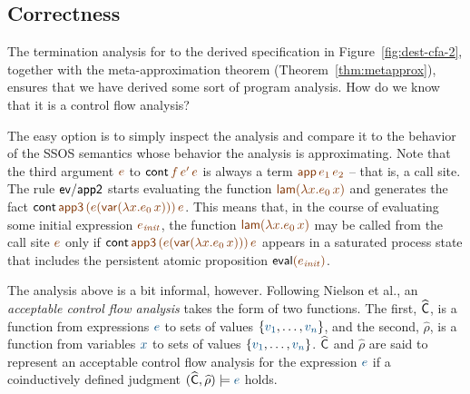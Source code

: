 \subsection{Correctness}

The termination analysis for to the derived specification in
Figure~\ref{fig:dest-cfa-2}, together with the meta-approximation
theorem (Theorem~\ref{thm:metapprox}), ensures that we have derived
some sort of program analysis. How do we know that it is a control 
flow analysis? 

The easy option is to simply inspect the analysis and compare it to
the behavior of the SSOS semantics whose behavior the analysis is
approximating.  Note that the third argument $\lf{e}$ to ${\sf
  cont}\,\lf{f}\,\lf{e'}\,\lf{e}$ is always a term $\lf{{\sf
    app}\,e_1\,e_2}$ -- that is, a call site. The rule ${\sf ev/app2}$
starts evaluating the function $\lf{{\sf lam}(\lambda x.e_0\,x)}$ and
generates the fact ${\sf cont}\,\lf{\sf app3}\,\lf{(e({\sf
    var}(\lambda x.e_0\,x)))}\,\lf{e}$. This means that, in the course
of evaluating some initial expression $\lf{e_{\it init}}$, the
function $\lf{{\sf lam}(\lambda x.e_0\,x)}$ may be called from the
call site $\lf{e}$ only if ${\sf cont}\,\lf{\sf app3}\,\lf{(e({\sf
    var}(\lambda x.e_0\,x)))}\,\lf{e}$ appears in a saturated process
state that includes the persistent atomic proposition ${\sf
  eval}\lf{(e_{\it init})}$.


The analysis above is a bit informal, however. Following Nielson et
al., an {\it acceptable control flow analysis} takes the form of two
functions. The first, $\widehat{\sf C}$, is a function from
expressions $\obj{e}$ to sets of values $\{\obj{v_1},
\ldots,\obj{v_n}\}$, and the second, $\widehat{\rho}$, is a function
from variables $\obj{x}$ to sets of values $\{\obj{v_1},
\ldots,\obj{v_n}\}$. $\widehat{\sf C}$ and $\widehat{\rho}$ are said
to represent an acceptable control flow analysis for the expression
$\obj{e}$ if a coinductively defined judgment $(\widehat{\sf
  C},\widehat{\rho}) \models \obj{e}$ holds.

